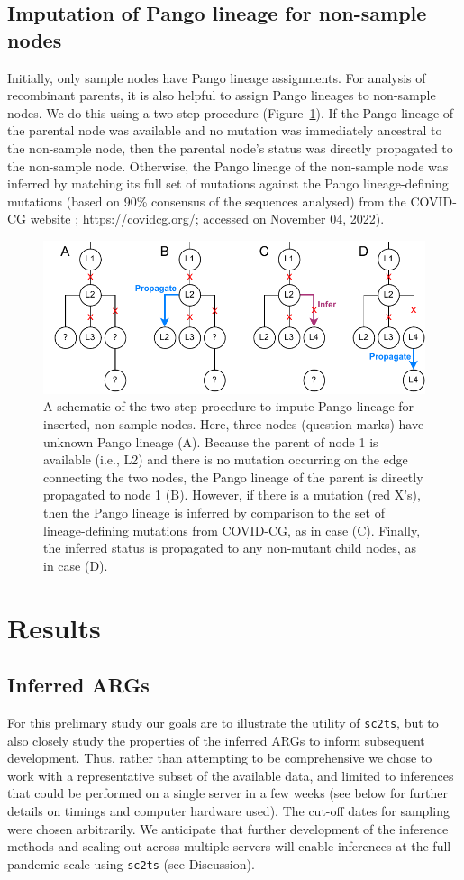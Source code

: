 \documentclass{article}
\begin{document}
\subsection{Imputation of Pango lineage for non-sample nodes}
Initially, only sample nodes have Pango lineage assignments.
For analysis of recombinant parents, it is also helpful to assign
Pango lineages to non-sample nodes. We do this
using a two-step procedure (Figure~\ref{fig:imputation}). If the Pango
lineage of the parental node was available and no mutation was immediately
ancestral to the non-sample node, then the parental node’s status was directly
propagated to the non-sample node. Otherwise, the Pango lineage of the
non-sample node was inferred by matching its full set of mutations against the
Pango lineage-defining mutations (based on 90\% consensus of the sequences
analysed) from the COVID-CG website \citep{Chen2021-zc};
\url{https://covidcg.org/}; accessed on November 04, 2022).

\begin{figure} \centering
\includegraphics[width=.7\textwidth]{figures/imputation.pdf}
\caption{\label{fig:imputation}A schematic of the two-step procedure to impute
Pango lineage for inserted, non-sample nodes. Here, three nodes (question
marks) have unknown Pango lineage (A). Because the parent of node 1 is
available (i.e., L2) and there is no mutation occurring on the edge connecting
the two nodes, the Pango lineage of the parent is directly propagated to node 1
(B). However, if there is a mutation (red X’s), then the Pango lineage is
inferred by comparison to the set of lineage-defining mutations from
COVID-CG\citep{Chen2021-zc}, as in case (C). Finally, the inferred status is
propagated to any non-mutant child nodes, as in case (D).
}
\end{figure}


\section{Results}
\subsection{Inferred ARGs}
For this prelimary study our goals are to illustrate the utility of
\texttt{sc2ts}, but to also closely study the properties of the
inferred ARGs to inform subsequent development. Thus, rather
than attempting to be comprehensive we chose to work with a
representative subset of the available data, and limited to
inferences that could be performed on a single server in
a few weeks (see below for further details on timings and
computer hardware used). The cut-off dates for sampling were chosen
arbitrarily. We anticipate that further development of the
inference methods and scaling out across multiple servers will
enable inferences at the full pandemic scale using \texttt{sc2ts}
(see Discussion).
\end{document}
